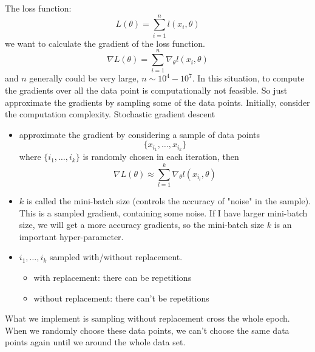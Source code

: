 The loss function:
$$L(\theta) = \sum_{i=1}^n l(x_i,\theta)$$
we want to calculate the gradient of the loss function. 
$$\nabla L(\theta) = \sum_{i=1}^n \nabla_\theta l(x_i,\theta)$$
and $n$ generally could be very large, $n \sim 10^4 - 10^7$. In this situation, to compute the gradients over all the data point is computationally not feasible. So just approximate the gradients by sampling some of the data points. 
Initially, consider the computation complexity. Stochastic gradient descent
\begin{itemize}
\item approximate the gradient by considering a sample of data points 
$$\{x_{i_1}, \ldots, x_{i_k}\}$$
where $\{i_1, \ldots, i_k\}$ is randomly chosen in each iteration, then
$$\nabla L(\theta) \approx \sum_{l=1}^k \nabla_\theta l(x_{i_l},\theta)$$
\item $k$ is called the mini-batch size (controls the accuracy of "noise" in the sample).
This is a sampled gradient, containing some noise. If I have larger mini-batch size, we will get a more accuracy gradients, so the mini-batch size $k$ is an important hyper-parameter.
\item $i_1, \ldots, i_k$ sampled with/without replacement.
\begin{itemize}
\item with replacement: there can be repetitions
\item without replacement: there can't be repetitions
\end{itemize}
\end{itemize}
What we implement is sampling without replacement cross the whole epoch. When we randomly choose these data points, we can't choose the same data points again until we around the whole data set. 

